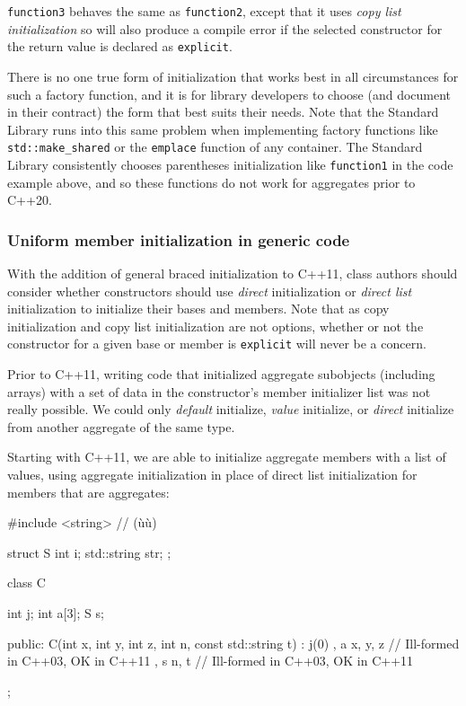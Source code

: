 \lstinline!function3! behaves the same as \lstinline!function2!, except that
it uses \emph{copy list initialization} so will also produce a compile
error if the selected constructor for the return value is declared as
\lstinline!explicit!.

There is no one true form of initialization that works best in all
circumstances for such a factory function, and it is for library
developers to choose (and document in their contract) the form that best
suits their needs. Note that the Standard Library runs into this same
problem when implementing factory functions like
\lstinline!std::make_shared! or the \lstinline!emplace! function of any
container. The Standard Library consistently chooses parentheses
initialization like \lstinline!function1! in the code example above, and so
these functions do not work for aggregates prior to C++20.

\subsubsection[Uniform member initialization in generic code]{Uniform member initialization in generic code}\label{uniform-member-initialization-in-generic-code}

With the addition of general braced initialization to C++11, class
authors should consider whether constructors should use \emph{direct}
initialization or \emph{direct list} initialization to initialize their
bases and members. Note that as copy initialization and copy list
initialization are not options, whether or not the constructor for a
given base or member is \lstinline!explicit! will never be a concern.

Prior to C++11, writing code that initialized aggregate subobjects
(including arrays) with a set of data in the constructor's member
initializer list was not really possible. We could only \emph{default}
initialize, \emph{value} initialize, or \emph{direct} initialize from
another aggregate of the same type.

Starting with C++11, we are able to initialize aggregate members with a
list of values, using aggregate initialization in place of direct list
initialization for members that are aggregates:

\begin{emcppshiddenlisting}[emcppsbatch=e18]
#include <string>  // (ù{}ù)
\end{emcppshiddenlisting}
\begin{emcppslisting}[emcppsbatch=e18]
struct S
{
    int         i;
    std::string str;
};

class C
{
    int j;
    int a[3];
    S   s;

public:
    C(int x, int y, int z, int n, const std::string t)
    : j(0)
    , a{ x, y, z }  // Ill-formed in C++03, OK in C++11
    , s{ n, t }     // Ill-formed in C++03, OK in C++11
    {
    }
};
\end{emcppslisting}
    

